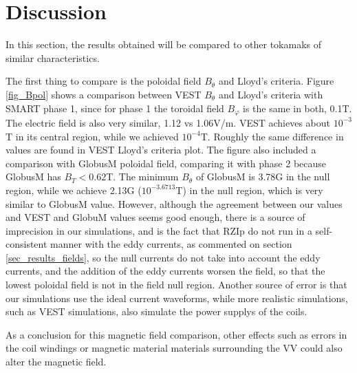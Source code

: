 \documentclass[a4paper,12pt,oneside]{book}
\begin{document}
\section{Discussion}

In this section, the results obtained will be compared to other tokamaks of similar characteristics.

The first thing to compare is the poloidal field $B_\theta$ and Lloyd's criteria. Figure \ref{fig_Bpol} shows a comparison between VEST $B_\theta$ and Lloyd's criteria with SMART phase 1, since for phase 1 the toroidal field $B_\varphi$ is the same in both, 0.1T. The electric field is also very similar, 1.12 vs 1.06V/m. VEST achieves about $10^{-3}$T in its central region, while we achieved $10^{-4}$T. Roughly the same difference in values are found in VEST Lloyd's criteria plot. The figure also included a comparison with GlobusM poloidal field, comparing it with phase 2 because GlobusM has $B_T<0.62$T. The minimum $B_\theta$ of GlobusM is 3.78G in the null region, while we achieve 2.13G ($10^{-3.6713}$T) in the null region, which is very similar to GlobusM value. However, although the agreement between our values and VEST and GlobuM values seems good enough, there is a source of imprecision in our simulations, and is the fact that RZIp do not run in a self-consistent manner with the eddy currents, as commented on section \ref{sec_results_fields}, so the null currents do not take into account the eddy currents, and the addition of the eddy currents worsen the field, so that the lowest poloidal field is not in the field null region. Another source of error is that our simulations use the ideal current waveforms, while more realistic simulations, such as VEST simulations, also simulate the power supplys of the coils.

As a conclusion for this magnetic field comparison, other effects such as errors in the coil windings or magnetic material materials surrounding the VV could also alter the magnetic field.
 
\end{document}
